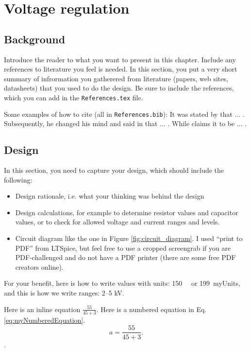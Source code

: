 \chapter{Voltage regulation}\label{ch:voltage_regulation}
\section{Background} \label{sec:pwr_backgroud}
Introduce the reader to what you want to present in this chapter. Include any references to literature you feel is needed. 
In this section, you put a very short summary of infrormation you gatherered from literature (papers, web sites, datasheets) that you used to do the design. Be sure to include the references, which you can add in the \texttt{References.tex} file. 

Some examples of how to cite (all in \texttt{References.bib}): 
It was stated by \cite{Booysen:2013} that ... . Subsequently, he changed his mind and said in  \cite{Gerber:2019} that ... .
While \cite{WebsiteOpAmp} claims it to be ... .

\section{Design} \label{sec:design_rectifier}

In this section, you need to capture your design, which should include the following: 
\begin{itemize}
  \item Design rationale, i.e. what your thinking was behind the design
  \item Design calculations, for example to determine resistor values and capacitor values, or to check for allowed voltage and current ranges and levels. 
  \item Circuit diagram like the one in Figure \ref{fig:circuit_diagram}. I used ``print to PDF'' from LTSpice,  but feel free to use a cropped screengrab if you are PDF-challenged and do not have a PDF printer (there are some free PDF creators online).
\end{itemize}

For your benefit, here is how to write values with units: \SI{150}{\milli\Omega} or \SI{199}{myUnits}, and this is how we write ranges: \numrange{2}{5} \si{\kilo\volt}.

Here is an inline equation $ \frac{55}{45+3}$. Here is a numbered equation in Eq. \ref{eq:myNumberedEquation}.
\begin{equation}
   a = \frac{55}{45+3}
   \label{eq:myNumberedEquation}. 
\end{equation}. 





